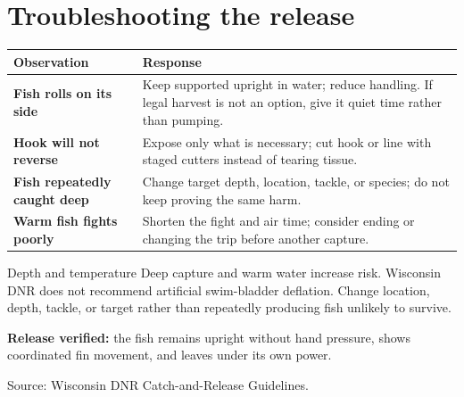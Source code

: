 \section{Troubleshooting the release}
\begin{tabularx}{\linewidth}{@{}>{\bfseries}p{.25\linewidth}X@{}}
\toprule Observation&Response\\\midrule
Fish rolls on its side&Keep supported upright in water; reduce handling. If
legal harvest is not an option, give it quiet time rather than pumping.\\
Hook will not reverse&Expose only what is necessary; cut hook or line with
staged cutters instead of tearing tissue.\\
Fish repeatedly caught deep&Change target depth, location, tackle, or species;
do not keep proving the same harm.\\
Warm fish fights poorly&Shorten the fight and air time; consider ending or
changing the trip before another capture.\\
\bottomrule
\end{tabularx}
\begin{teloshazard}{Depth and temperature}
Deep capture and warm water increase risk. Wisconsin DNR does not recommend
artificial swim-bladder deflation. Change location, depth, tackle, or target
rather than repeatedly producing fish unlikely to survive.
\end{teloshazard}
\textbf{Release verified:} the fish remains upright without hand pressure,
shows coordinated fin movement, and leaves under its own power.

\small Source: Wisconsin DNR Catch-and-Release Guidelines.

